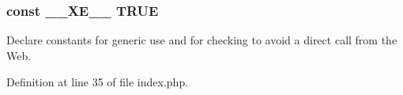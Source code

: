 \subsubsection[{\+\_\+\+\_\+\+X\+E\+\_\+\+\_\+}]{\setlength{\rightskip}{0pt plus 5cm}const \+\_\+\+\_\+\+X\+E\+\_\+\+\_\+ T\+R\+U\+E}\label{index_8php_a697de427d83b791899ae45d555377756}


Declare constants for generic use and for checking to avoid a direct call from the Web. 



Definition at line 35 of file index.\+php.

